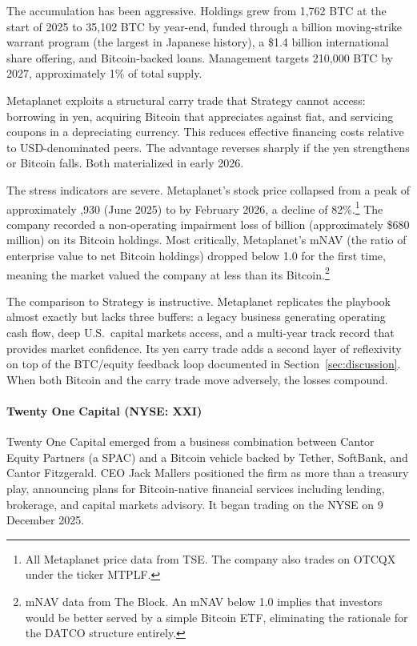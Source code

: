 The accumulation has been aggressive. Holdings grew from 1,762 BTC at the start of 2025 to 35,102 BTC by year-end, funded through a  billion moving-strike warrant program (the largest in Japanese history), a \$1.4 billion international share offering, and Bitcoin-backed loans. Management targets 210,000 BTC by 2027, approximately 1\% of total supply.

Metaplanet exploits a structural carry trade that Strategy cannot access: borrowing in yen, acquiring Bitcoin that appreciates against fiat, and servicing coupons in a depreciating currency. This reduces effective financing costs relative to USD-denominated peers. The advantage reverses sharply if the yen strengthens or Bitcoin falls. Both materialized in early 2026.

The stress indicators are severe. Metaplanet's stock price collapsed from a peak of approximately ,930 (June 2025) to  by February 2026, a decline of 82\%.\footnote{All Metaplanet price data from TSE. The company also trades on OTCQX under the ticker MTPLF.} The company recorded a non-operating impairment loss of  billion (approximately \$680 million) on its Bitcoin holdings. Most critically, Metaplanet's mNAV (the ratio of enterprise value to net Bitcoin holdings) dropped below 1.0 for the first time, meaning the market valued the company at less than its Bitcoin.\footnote{mNAV data from The Block. An mNAV below 1.0 implies that investors would be better served by a simple Bitcoin ETF, eliminating the rationale for the DATCO structure entirely.}

The comparison to Strategy is instructive. Metaplanet replicates the playbook almost exactly but lacks three buffers: a legacy business generating operating cash flow, deep U.S.\ capital markets access, and a multi-year track record that provides market confidence. Its yen carry trade adds a second layer of reflexivity on top of the BTC/equity feedback loop documented in Section~\ref{sec:discussion}. When both Bitcoin and the carry trade move adversely, the losses compound.

\paragraph{Twenty One Capital (NYSE: XXI)}

Twenty One Capital emerged from a business combination between Cantor Equity Partners (a SPAC) and a Bitcoin vehicle backed by Tether, SoftBank, and Cantor Fitzgerald. CEO Jack Mallers positioned the firm as more than a treasury play, announcing plans for Bitcoin-native financial services including lending, brokerage, and capital markets advisory. It began trading on the NYSE on 9 December 2025.

